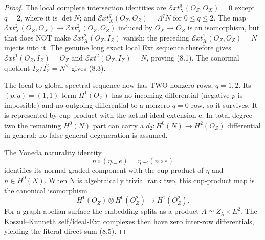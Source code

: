 \documentclass[11pt,a4paper]{article}
\begin{document}
\begin{proof}
The local complete
intersection identities
are
\(
 \mathcal Ext^q_X(O_Z,O_X)=0
\)
except \(q=2\),
where it is \(\det N\);
and
\(
 \mathcal Ext^q_X(O_Z,O_Z)
 =\Lambda^q N
\)
for \(0\le q\le2\).
The map
\(
 \mathcal Ext^2_X(O_Z,O_X)
 \to\mathcal Ext^2_X(O_Z,O_Z)
\)
induced by \(O_X\to O_Z\)
is an isomorphism,
but that does NOT make
\(\mathcal Ext^2_X(O_Z,I_Z)\)
vanish: the preceding
\(\mathcal Ext^1_X(O_Z,O_Z)=N\)
injects into it.
The genuine long exact
local Ext sequence
therefore gives
\(\mathcal Ext^1(O_Z,I_Z)=O_Z\)
and
\(\mathcal Ext^2(O_Z,I_Z)=N\),
proving (8.1).
The conormal quotient
\(I_Z/I_Z^2=N^\vee\)
gives (8.3).

The local-to-global
spectral sequence now
has TWO nonzero rows,
\(q=1,2\).
Its \((p,q)=(1,1)\)
term \(H^1(O_Z)\)
has no incoming
differential (negative
\(p\) is impossible)
and no outgoing
differential to a
nonzero \(q=0\) row,
so it survives.
It is represented
by cup product with
the actual ideal
extension e. In
total degree two
the remaining
\(H^0(N)\) part
can carry a
\(d_2:H^0(N)\to
H^2(O_Z)\) differential
in general; no false
general degeneration
is assumed.

The Yoneda naturality
identity
\[
 n\circ(\eta\smile e)
       =\eta\smile(n\circ e)
\]
identifies its normal
graded component
with the cup product
of \(\eta\) and
\(n\in H^0(N)\).
When N is
algebraically trivial
rank two, this
cup-product map is the
canonical isomorphism
\[
 H^1(O_Z)\otimes H^0(O_Z^2)
                  \longrightarrow H^1(O_Z^2).
\]
For a graph abelian
surface the embedding
splits as a product
\(A\simeq Z_\lambda\times E^2\).
The Koszul--Kunneth
self/ideal-Ext complexes
then have zero
inter-row differentials,
yielding the literal
direct sum (8.5).
\end{proof}
\end{document}
